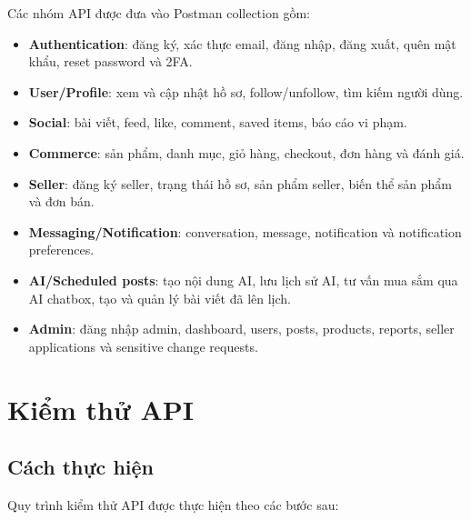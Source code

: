 Các nhóm API được đưa vào Postman collection gồm:

\begin{itemize}
    \item \textbf{Authentication}: đăng ký, xác thực email, đăng nhập, đăng xuất, quên mật khẩu, reset password và 2FA.
    \item \textbf{User/Profile}: xem và cập nhật hồ sơ, follow/unfollow, tìm kiếm người dùng.
    \item \textbf{Social}: bài viết, feed, like, comment, saved items, báo cáo vi phạm.
    \item \textbf{Commerce}: sản phẩm, danh mục, giỏ hàng, checkout, đơn hàng và đánh giá.
    \item \textbf{Seller}: đăng ký seller, trạng thái hồ sơ, sản phẩm seller, biến thể sản phẩm và đơn bán.
    \item \textbf{Messaging/Notification}: conversation, message, notification và notification preferences.
    \item \textbf{AI/Scheduled posts}: tạo nội dung AI, lưu lịch sử AI, tư vấn mua sắm qua AI chatbox, tạo và quản lý bài viết đã lên lịch.
    \item \textbf{Admin}: đăng nhập admin, dashboard, users, posts, products, reports, seller applications và sensitive change requests.
\end{itemize}

\section{Kiểm thử API}

\subsection{Cách thực hiện}

Quy trình kiểm thử API được thực hiện theo các bước sau:

